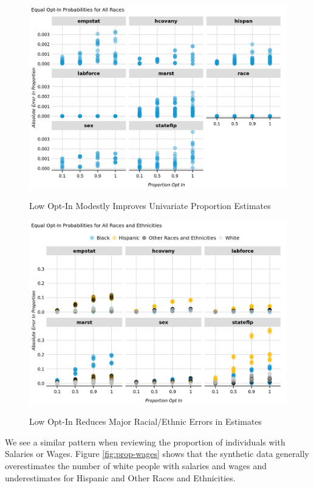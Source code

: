 \documentclass[
]{urban-formatting}
\begin{document}
\begin{figure}[!htb]
    \caption{Low Opt-In Modestly Improves Univariate Proportion Estimates}
    \centering
    \includegraphics[width=6.5in]{../analysis/figures/proportions-1.png}
    \label{fig:proportions}
\end{figure}

\begin{figure}[!htb]
    \caption{Low Opt-In Reduces Major Racial/Ethnic Errors in Estimates}
    \centering
    \includegraphics[width=6.5in]{../analysis/figures/proportions-3.png}
    \label{fig:proportions-race-ethnicity}
\end{figure}

We see a similar pattern when reviewing the proportion of individuals
with Salaries or Wages. Figure \ref{fig:prop-wages} shows that the
synthetic data generally overestimates the number of white people with
salaries and wages and underestimates for Hispanic and Other Races and
Ethnicities.
\end{document}
